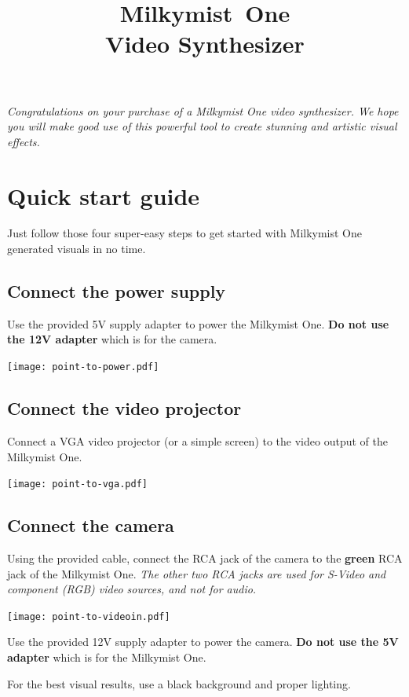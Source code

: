 \documentclass{leaflet}
\title{Milkymist\texttrademark~One\\Video Synthesizer}
\date{}
\begin{document}
\maketitle
\thispagestyle{empty}
\pagestyle{empty} 
\textit{Congratulations on your purchase of a Milkymist One video synthesizer. We hope you will make good use of this powerful tool to create stunning and artistic visual effects.}

\section{Quick start guide}
Just follow those four super-easy steps to get started with Milkymist One generated visuals in no time.

\subsection{Connect the power supply}
Use the provided 5V supply adapter to power the Milkymist One. \textbf{Do not use the 12V adapter} which is for the camera.

\texttt{[image: point-to-power.pdf]}

\subsection{Connect the video projector}
Connect a VGA video projector (or a simple screen) to the video output of the Milkymist One.

\texttt{[image: point-to-vga.pdf]}

\subsection{Connect the camera}
Using the provided cable, connect the RCA jack of the camera to the \textbf{green} RCA jack of the Milkymist One. \textit{The other two RCA jacks are used for S-Video and component (RGB) video sources, and not for audio.}

\texttt{[image: point-to-videoin.pdf]}

Use the provided 12V supply adapter to power the camera. \textbf{Do not use the 5V adapter} which is for the Milkymist One.

For the best visual results, use a black background and proper lighting.
\end{document}
